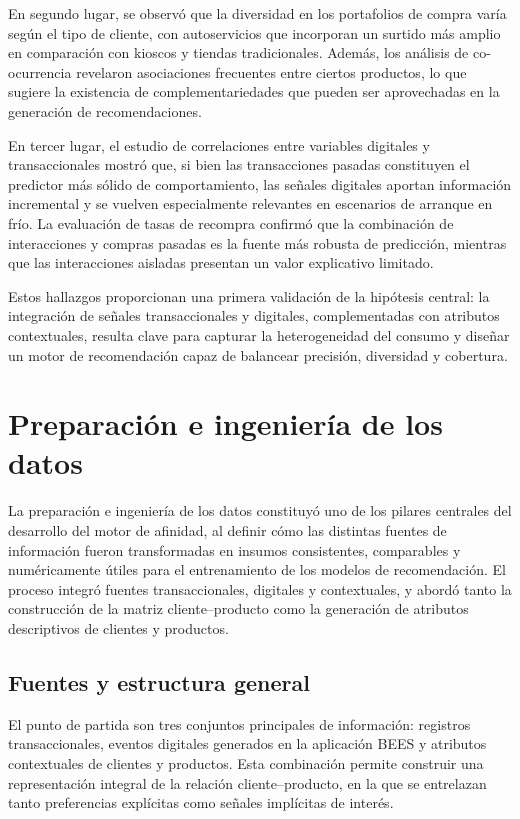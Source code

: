En segundo lugar, se observó que la diversidad en los portafolios de compra varía según el tipo de cliente, con autoservicios que incorporan un surtido más amplio en comparación con kioscos y tiendas tradicionales. Además, los análisis de co-ocurrencia revelaron asociaciones frecuentes entre ciertos productos, lo que sugiere la existencia de complementariedades que pueden ser aprovechadas en la generación de recomendaciones.  

En tercer lugar, el estudio de correlaciones entre variables digitales y transaccionales mostró que, si bien las transacciones pasadas constituyen el predictor más sólido de comportamiento, las señales digitales aportan información incremental y se vuelven especialmente relevantes en escenarios de arranque en frío. La evaluación de tasas de recompra confirmó que la combinación de interacciones y compras pasadas es la fuente más robusta de predicción, mientras que las interacciones aisladas presentan un valor explicativo limitado.  

Estos hallazgos proporcionan una primera validación de la hipótesis central: la integración de señales transaccionales y digitales, complementadas con atributos contextuales, resulta clave para capturar la heterogeneidad del consumo y diseñar un motor de recomendación capaz de balancear precisión, diversidad y cobertura.


\section{Preparación e ingeniería de los datos}

La preparación e ingeniería de los datos constituyó uno de los pilares centrales del desarrollo del motor de afinidad, al definir cómo las distintas fuentes de información fueron transformadas en insumos consistentes, comparables y numéricamente útiles para el entrenamiento de los modelos de recomendación. El proceso integró fuentes transaccionales, digitales y contextuales, y abordó tanto la construcción de la matriz cliente–producto como la generación de atributos descriptivos de clientes y productos.

\subsection{Fuentes y estructura general}

El punto de partida son tres conjuntos principales de información: registros transaccionales, eventos digitales generados en la aplicación BEES y atributos contextuales de clientes y productos. Esta combinación permite construir una representación integral de la relación cliente–producto, en la que se entrelazan tanto preferencias explícitas como señales implícitas de interés.

